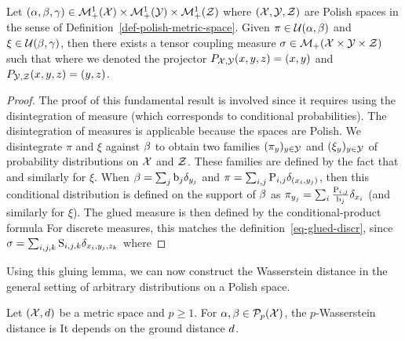 \begin{lem}\label{lem-gluing-general}
	Let $(\alpha,\beta,\gamma) \in \mathcal{M}_+^1(\mathcal{X}) \times \mathcal{M}_+^1(\mathcal{Y}) \times \mathcal{M}_+^1(\mathcal{Z})$
	where $(\mathcal{X},\mathcal{Y},\mathcal{Z})$ are Polish spaces in the sense of Definition~\ref{def-polish-metric-space}.
	Given $\pi \in \mathcal{U}(\alpha,\beta)$ and $\xi \in \mathcal{U}(\beta,\gamma)$, then there exists a tensor coupling measure
	$\sigma \in \mathcal{M}_+(\mathcal{X} \times \mathcal{Y} \times \mathcal{Z})$ such that
	where we denoted the projector $P_{\mathcal{X},\mathcal{Y}}(x,y,z)=(x,y)$ and $P_{\mathcal{Y},\mathcal{Z}}(x,y,z)=(y,z)$.
\end{lem}
\begin{proof}
	The proof of this fundamental result is involved since it requires using the disintegration of measure (which corresponds to conditional probabilities).
	The disintegration of measures is applicable because the spaces are Polish.
	We disintegrate $\pi$ and $\xi$ against $\beta$ to obtain two families $(\pi_y)_{y \in \mathcal{Y}}$ and $(\xi_y)_{y \in \mathcal{Y}}$ of probability distributions on $\mathcal{X}$ and $\mathcal{Z}$. These families are defined by the fact that
	and similarly for $\xi$.
	When $\beta=\sum_j \mathrm{b}_j \delta_{y_j}$ and $\pi=\sum_{i,j} \mathrm{P}_{i,j} \delta_{(x_i,y_j)}$, then this conditional distribution is defined on the support of $\beta$ as
	$\pi_{y_j} = \sum_i \frac{\mathrm{P}_{i,j}}{\mathrm{b}_j} \delta_{x_i}$ (and similarly for $\xi$).
		The glued measure is then defined by the conditional-product formula
	For discrete measures, this matches the definition~\eqref{eq-glued-discr}, since $\sigma=\sum_{i,j,k} \mathrm{S}_{i,j,k} \delta_{x_i,y_j,z_k}$ where
\end{proof}

Using this gluing lemma, we can now construct the Wasserstein distance in the general setting of arbitrary distributions on a Polish space.

\begin{defn}\label{def-wasserstein-distance}
	Let $(\mathcal{X},d)$ be a metric space and $p\geq1$. For $\alpha,\beta\in\mathcal{P}_p(\mathcal{X})$, the $p$-Wasserstein distance is
	It depends on the ground distance $d$.
\end{defn}

